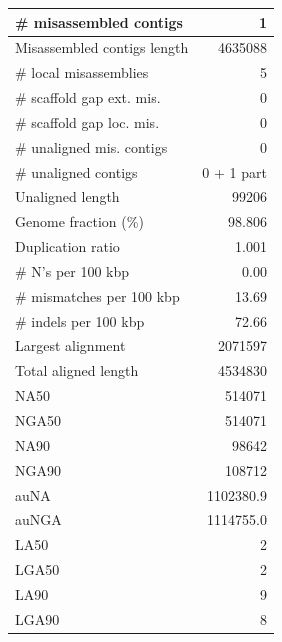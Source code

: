 \documentclass[12pt,a4paper]{article}
\begin{document}
\begin{table}[ht]
\begin{center}
\begin{tabular}{|l*{1}{|r}|}
\# misassembled contigs & 1 \\ \hline
Misassembled contigs length & 4635088 \\ \hline
\# local misassemblies & 5 \\ \hline
\# scaffold gap ext. mis. & 0 \\ \hline
\# scaffold gap loc. mis. & 0 \\ \hline
\# unaligned mis. contigs & 0 \\ \hline
\# unaligned contigs & 0 + 1 part \\ \hline
Unaligned length & 99206 \\ \hline
Genome fraction (\%) & 98.806 \\ \hline
Duplication ratio & 1.001 \\ \hline
\# N's per 100 kbp & 0.00 \\ \hline
\# mismatches per 100 kbp & 13.69 \\ \hline
\# indels per 100 kbp & 72.66 \\ \hline
Largest alignment & 2071597 \\ \hline
Total aligned length & 4534830 \\ \hline
NA50 & 514071 \\ \hline
NGA50 & 514071 \\ \hline
NA90 & 98642 \\ \hline
NGA90 & 108712 \\ \hline
auNA & 1102380.9 \\ \hline
auNGA & 1114755.0 \\ \hline
LA50 & 2 \\ \hline
LGA50 & 2 \\ \hline
LA90 & 9 \\ \hline
LGA90 & 8 \\ \hline
\end{tabular}
\end{center}
\end{table}
\end{document}
